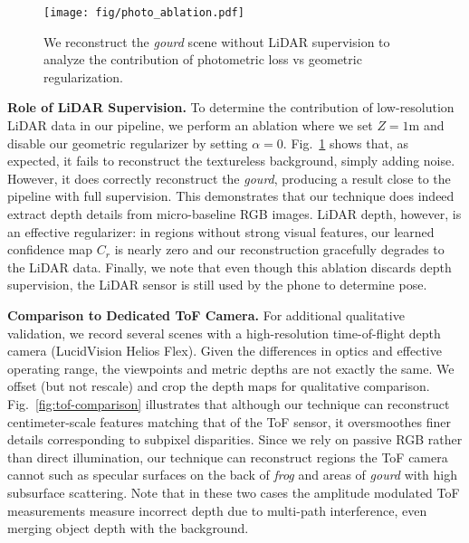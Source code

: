 \begin{figure}[t]
    \centering
    \texttt{[image: fig/photo\_ablation.pdf]}
    \caption{We reconstruct the \emph{gourd} scene without LiDAR supervision to analyze the contribution of photometric loss vs geometric regularization.}
    \label{fig:photo-ablation}
    \vspace{-1em}
\end{figure}

\vspace{0.5em}\noindent\textbf{Role of LiDAR Supervision.}\hspace{0.1em} To determine the contribution of low-resolution LiDAR data in our pipeline, we perform an ablation where we set $Z = 1$m and disable our geometric regularizer by setting $\alpha=0$. Fig.~\ref{fig:photo-ablation} shows that, as expected, it fails to reconstruct the textureless background, simply adding noise. However, it does correctly reconstruct the \emph{gourd}, producing a result close to the pipeline with full supervision. This demonstrates that our technique does indeed extract depth details from micro-baseline RGB images. LiDAR depth, however, is an effective regularizer: in regions without strong visual features, our learned confidence map $C_r$ is nearly zero and our reconstruction gracefully degrades to the LiDAR data. Finally, we note that even though this ablation discards depth supervision, the LiDAR sensor is still used by the phone to determine pose.

\vspace{0.5em}\noindent\textbf{Comparison to Dedicated ToF Camera.}\hspace{0.1em} For additional qualitative validation, we record several scenes with a high-resolution time-of-flight depth camera (LucidVision Helios Flex). Given the differences in optics and effective operating range, the viewpoints and metric depths are not exactly the same. We offset (but not rescale) and crop the depth maps for qualitative comparison. Fig.~\ref{fig:tof-comparison} illustrates that although our technique can reconstruct centimeter-scale features matching that of the ToF sensor, it oversmoothes finer details corresponding to subpixel disparities. Since we rely on passive RGB rather than direct illumination, our technique can reconstruct regions the ToF camera cannot such as specular surfaces on the back of \emph{frog} and areas of \emph{gourd} with high subsurface scattering. Note that in these two cases the amplitude modulated ToF measurements measure incorrect depth due to multi-path interference, even merging object depth with the background.

